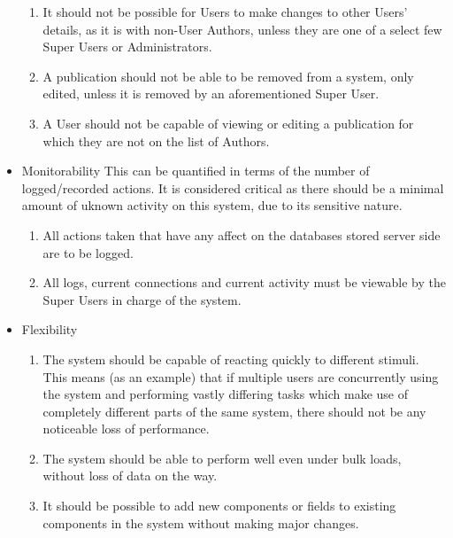 \documentclass[hidelinks,a4paper,12pt]{article}
\begin{document}
\begin{itemize}
\begin{enumerate}
					\item It should not be possible for Users to make changes to other Users' details, as it is with non-User Authors, unless they are one of a select few Super Users or Administrators.
					\item A publication should not be able to be removed from a system, only edited, unless it is removed by an aforementioned Super User.
					\item A User should not be capable of viewing or editing a publication for which they are not on the list of Authors.
				\end{enumerate}
				\item Monitorability
				This can be quantified in terms of the number of logged/recorded actions. It is considered critical as there should be a minimal amount of uknown activity on this system, due to its sensitive nature. 
				\begin{enumerate}
					\item All actions taken that have any affect on the databases stored server side are to be logged.
					\item All logs, current connections and current activity must be viewable by the Super Users in charge of the system.
				\end{enumerate}
				\item Flexibility
				\begin{enumerate}
					\item The system should be capable of reacting quickly to different stimuli. This means (as an example) that if multiple users are concurrently using the system and performing vastly differing tasks which make use of completely different parts of the same system, there should not be any noticeable loss of performance.
					\item The system should be able to perform well even under bulk loads, without loss of data on the way.
					\item It should be possible to add new components or fields to existing components in the system without making major changes. 
				\end{enumerate}
			\end{itemize}
\end{document}

